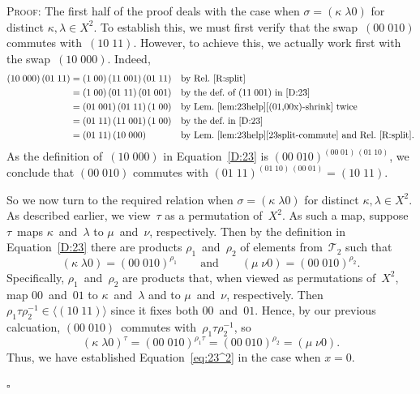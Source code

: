 \documentclass[a4paper,11pt]{article}
\numberwithin{equation}{section}
\newcommand{\swap}[2]{(#1\;#2)}
\newcommand{\Sw}[1]{\mathcal{T}_{#1}}
\newcommand{\qed}{\hspace*{\fill}$\square$}
\newenvironment{proof}{%
  \begin{trivlist}\item\textsc{Proof:}}{\qed\end{trivlist}}
\begin{document}
\begin{proof}
  The first half of the proof deals with the case when $\sigma =
  \swap{\kappa}{\lambda0}$ for distinct $\kappa,\lambda \in X^{2}$.
  To establish this, we must first verify that the
  swap~$\swap{00}{010}$ commutes with~$\swap{10}{11}$.  However, to
  achieve this, we actually work first with the
  swap~$\swap{10}{000}$.  Indeed,
  \begin{align*}
    \swap{10}{000} \, \swap{01}{11} &=
    \swap{1}{00} \, \swap{11}{001} \, \swap{01}{11}
    &&\text{by Rel.~\ref{R:split}} \\
    &= \swap{1}{00} \, \swap{01}{11} \, \swap{01}{001}
    &&\text{by the def.\ of~$\swap{11}{001}$ in~\eqref{D:23}} \\
    &= \swap{01}{001} \, \swap{01}{11} \, \swap{1}{00}
    &&\text{by Lem.~\ref{lem:23help}\ref{(01,00x)-shrink} twice} \\
    &= \swap{01}{11} \, \swap{11}{001} \, \swap{1}{00}
    &&\text{by the def.\ in~\eqref{D:23}} \\
    &= \swap{01}{11} \, \swap{10}{000}
    &&\text{by Lem.~\ref{lem:23help}\ref{23split-commute} and
      Rel.~\ref{R:split}.}
  \end{align*}
  As the definition of~$\swap{10}{000}$ in Equation~\eqref{D:23} is
  $\swap{00}{010}^{\swap{00}{01} \, \swap{01}{10}}$, we conclude that
  $\swap{00}{010}$ commutes with $\swap{01}{11}^{\swap{01}{10} \,
    \swap{00}{01}} = \swap{10}{11}$.

  So we now turn to the required relation when $\sigma =
  \swap{\kappa}{\lambda0}$ for distinct $\kappa,\lambda \in X^{2}$.
  As described earlier, we view~$\tau$ as a permutation of~$X^{2}$.
  As such a map, suppose $\tau$~maps $\kappa$~and~$\lambda$ to
  $\mu$~and~$\nu$, respectively.  Then by the definition in
  Equation~\eqref{D:23} there are products $\rho_{1}$~and~$\rho_{2}$
  of elements from~$\Sw{2}$ such that
  \[
  \swap{\kappa}{\lambda0} = \swap{00}{010}^{\rho_{1}}
  \qquad \text{and} \qquad
  \swap{\mu}{\nu0} = \swap{00}{010}^{\rho_{2}}.
  \]
  Specifically, $\rho_{1}$~and~$\rho_{2}$ are products that, when
  viewed as permutations of~$X^{2}$, map $00$~and~$01$ to
  $\kappa$~and~$\lambda$ and to $\mu$~and~$\nu$, respectively.  Then
  $\rho_{1} \tau \rho_{2}^{-1} \in \langle \swap{10}{11} \rangle$
  since it fixes both $00$~and~$01$.  Hence, by our previous
  calcuation, $\swap{00}{010}$~commutes with~$\rho_{1} \tau
  \rho_{2}^{-1}$, so
  \begin{equation}
    \swap{\kappa}{\lambda0}^{\tau} = \swap{00}{010}^{\rho_{1}\tau} =
    \swap{00}{010}^{\rho_{2}} = \swap{\mu}{\nu0}.
    \label{eq:23^2-case0}
  \end{equation}
  Thus, we have established Equation~\eqref{eq:23^2} in the case when
  $x = 0$.


\end{proof}
\end{document}
